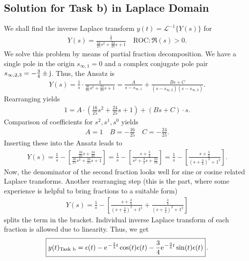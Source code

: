 \documentclass[a4paper,11pt,oneside]{scrartcl}
\begin{document}
\subsection{Solution for Task b) in Laplace Domain}
We shall find the inverse Laplace transform $y(t) = \mathcal{L}^{-1}\{Y(s)\}$
for
\begin{align}
Y(s) = \frac{\frac{1}{s}}{\frac{16}{25} s^2 + \frac{24}{25} s + 1}
\quad \text{ROC}: \Re(s) > 0.
\end{align}
%
We solve this problem by means of partial fraction decomposition.
We have a single pole in the origin $s_{\infty,1}=0$ and a complex conjugate
pole pair $s_{\infty,2,3}=-\frac{3}{4}\pm \im$.
Thus, the Ansatz is
\begin{align}
Y(s) = \frac{1}{s}
\cdot \frac{1}{\frac{16}{25} s^2 + \frac{24}{25} s + 1} =
\frac{A}{s-s_{\infty,1}} + \frac{Bs+C}{(s-s_{\infty,2})(s-s_{\infty,3})}.
\end{align}
Rearranging yields
\begin{align}
1 =
A \cdot (\frac{16}{25} s^2 + \frac{24}{25} s + 1) +
(B s + C) \cdot s.
\end{align}
Comparison of coefficients for $s^2, s^1, s^0$ yields
\begin{align}
  A = 1\quad B = -\frac{16}{25} \quad C = -\frac{24}{25}.
\end{align}
Inserting these into the Ansatz leads to
\begin{align}
Y(s) =
\frac{1}{s} - \left[\frac{\frac{16}{25} s + \frac{24}{25}}{\frac{16}{25} s^2 + \frac{24}{25} s + 1}\right]=
\frac{1}{s} - \left[\frac{s + \frac{3}{2}}{s^2 + \frac{3}{2} s + \frac{25}{16}}\right]=
\frac{1}{s} - \left[\frac{s + \frac{3}{2}}{(s + \frac{3}{4})^2 + 1^2}\right].
\end{align}
Now, the denominator of the second fraction looks well for sine or cosine related
Laplace transforms.
Another rearranging step (this is the part, where some experience
is helpful to bring fractions to a suitable form)
\begin{align}
Y(s) =
\frac{1}{s} - \left[\frac{s + \frac{3}{4}}{(s + \frac{3}{4})^2 + 1^2} +
\frac{\frac{3}{4}}{(s+\frac{3}{4})^2 + 1^2}\right]
\end{align}
splits the term in the bracket.
Individual inverse Laplace transform of each fraction is allowed due to
linearity. Thus, we get
\begin{align}
\boxed{y(t)_\text{Task b} =
\epsilon(t)
- \e^{-\frac{3}{4} t} \cos(t) \epsilon(t)
- \frac{3}{4}\e^{-\frac{3}{4} t} \sin(t) \epsilon(t)}\,.
\end{align}
\end{document}
